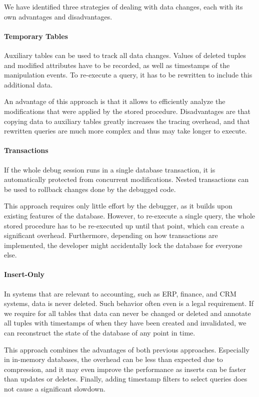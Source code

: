 \documentclass[english]{scrartcl}
\begin{document}
We have identified three strategies of dealing with data changes, each with its own advantages and disadvantages.

\paragraph{Temporary Tables}
Auxiliary tables can be used to track all data changes.
Values of deleted tuples and modified attributes have to be recorded, as well as timestamps of the manipulation events.
To re-execute a query, it has to be rewritten to include this additional data.

An advantage of this approach is that it allows to efficiently analyze the modifications that were applied by the stored procedure.
Disadvantages are that copying data to auxiliary tables greatly increases the tracing overhead, and that rewritten queries are much more complex and thus may take longer to execute.

\paragraph{Transactions}
If the whole debug session runs in a single database transaction, it is automatically protected from concurrent modifications.
Nested transactions can be used to rollback changes done by the debugged code.

This approach requires only little effort by the debugger, as it builds upon existing features of the database.
However, to re-execute a single query, the whole stored procedure has to be re-executed up until that point, which can create a significant overhead.
Furthermore, depending on how transactions are implemented, the developer might accidentally lock the database for everyone else.

\paragraph{Insert-Only}
In systems that are relevant to accounting, such as ERP, finance, and CRM systems, data is never deleted.
Such behavior often even is a legal requirement.
If we require for all tables that data can never be changed or deleted and annotate all tuples with timestamps of when they have been created and invalidated, we can reconstruct the state of the database of any point in time.

This approach combines the advantages of both previous approaches.
Especially in in-memory databases, the overhead can be less than expected due to compression, and it may even improve the performance as inserts can be faster than updates or deletes.
Finally, adding timestamp filters to select queries does not cause a significant slowdown.
\end{document}
